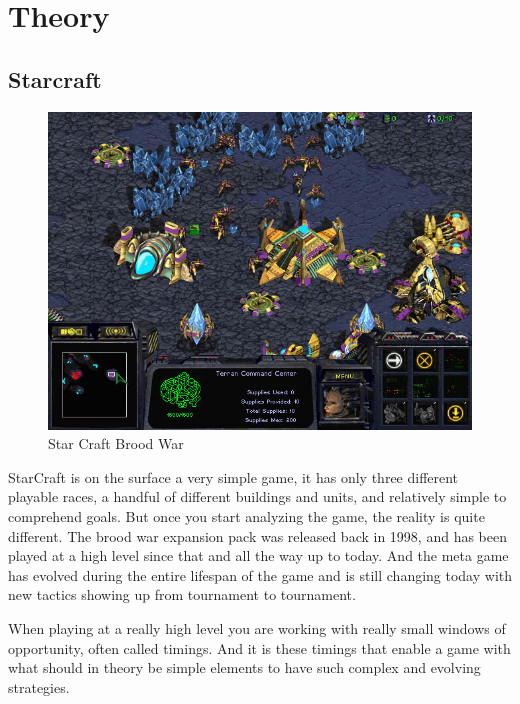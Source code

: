 
\chapter{Theory}
\section{Starcraft}

\begin{figure}[h!tb]
\centering
\includegraphics[scale=0.5]{graphics/scbw.jpg}
\caption{Star Craft Brood War \cite{test}}
\label{fig:scbwIntro}
\end{figure}
StarCraft is on the surface a very simple game, it has only three different playable races, a
handful of different buildings and units, and relatively simple to comprehend
goals. But once you start analyzing the game, the reality is quite different. The brood war expansion pack was released back in 1998, and has been played at a high level since that and all the way up to today. And the meta game has evolved during the entire lifespan of the game and is still changing today with new tactics showing up from tournament to tournament.
\cite{blizzardstarcraft}

When playing at a really high level you are working with really small windows of opportunity, often called timings. And it is these timings that enable a game with what should in theory be simple elements to have such complex and evolving strategies.

